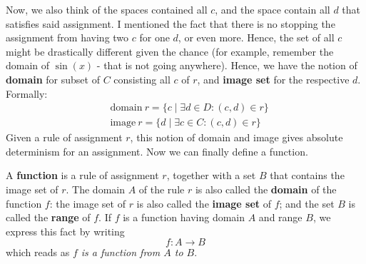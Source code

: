 Now, we also think of the spaces contained all $c$, and the space contain all $d$ that satisfies said assignment. I mentioned the fact that there is no stopping the assignment from having two $c$ for one $d$, or even more. Hence, the set of all $c$ might be drastically different given the chance (for example, remember the domain of $\sin{(x)}$ - that is not going anywhere). Hence, we have the notion of \textbf{domain} for subset of $C$ consisting all $c$ of $r$, and \textbf{image set} for the respective $d$. Formally: 
\begin{align*}
    &\mathrm{domain}\: r = \{c\mid \exists d\in D : (c,d)\in r\} \\ 
    & \mathrm{image}\: r = \{d\mid \exists c\in C : (c,d)\in r\}
\end{align*}
Given a rule of assignment $r$, this notion of domain and image gives absolute determinism for an assignment. Now we can finally define a function. 
\begin{definition}
    A \textbf{function} is a rule of assignment $r$, together with a set $B$ that contains the image set of $r$. The domain $A$ of the rule $r$ is also called the \textbf{domain} of the function $f$: the image set of $r$ is also called the \textbf{image set} of $f$; and the set $B$ is called the \textbf{range} of $f$. If $f$ is a function having domain $A$ and range $B$, we express this fact by writing \begin{equation*}
        f: A\longrightarrow B
    \end{equation*}
    which reads as \textit{$f$ is a function from $A$ to $B$}. 
\end{definition}

